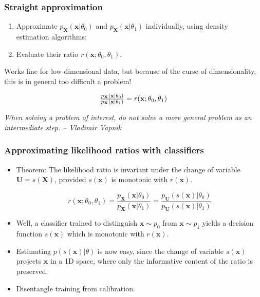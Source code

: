 \documentclass{beamer}
\newcommand{\mathnode}[2]{%
  \mathord{\tikz[baseline=(#1.base), inner sep = 0pt]{\node (#1) {$#2$};}}}
\begin{document}
\begin{frame}[fragile]
    \frametitle{Straight approximation}

    \begin{enumerate}
        \item Approximate $p_\mathbf{X}(\mathbf{x}|\theta_0)$ and $p_\mathbf{X}(\mathbf{x}|\theta_1)$ individually, using density estimation algorithms;
        \item Evaluate their ratio $r(\mathbf{x};\theta_0,\theta_1)$.
    \end{enumerate}

    \vspace{1em}

    Works fine for low-dimensional data, but because of the curse of dimensionality, this is in general too difficult a problem!

    $$
      \mathnode{A}{  \frac{ p_\mathbf{X}(\mathbf{x}|\theta_0)}{ p_\mathbf{X}(\mathbf{x}|\theta_1)} } = \mathnode{B}{ r(\mathbf{x};\theta_0,\theta_1)}
    $$


    \vspace{1em}

    {\centering \it When solving a problem of interest, do not solve a more general problem as an intermediate step. -- Vladimir Vapnik}

\end{frame}

\begin{frame}
    \frametitle{Approximating likelihood ratios with classifiers}

    \begin{itemize}
        \item Theorem: The likelihood ratio is invariant under the change of variable $\mathbf{U} = s(\mathbf{X})$, provided $s(\mathbf{x})$ is monotonic with $r(\mathbf{x})$.

        $$
        r(\mathbf{x};\theta_0,\theta_1) = \frac{ p_\mathbf{X}(\mathbf{x}|\theta_0)}{ p_\mathbf{X}(\mathbf{x}|\theta_1)} = \frac{ p_\mathbf{U}(s(\mathbf{x})|\theta_0)}{ p_\mathbf{U}(s(\mathbf{x})|\theta_1)}
        $$

        \item Well, a classifier trained to distinguish $\mathbf{x} \sim p_0$ from $\mathbf{x} \sim p_1$ yields a decision function $s(\mathbf{x})$ which is monotonic with $r(\mathbf{x})$.

        \item Estimating $p(s(\mathbf{x})|\theta)$ is now easy, since the change of variable $s(\mathbf{x})$ projects $\mathbf{x}$ in a 1D space, where only the informative content of the ratio is preserved.

        \item Disentangle training from calibration.
    \end{itemize}
\end{frame}
\end{document}
